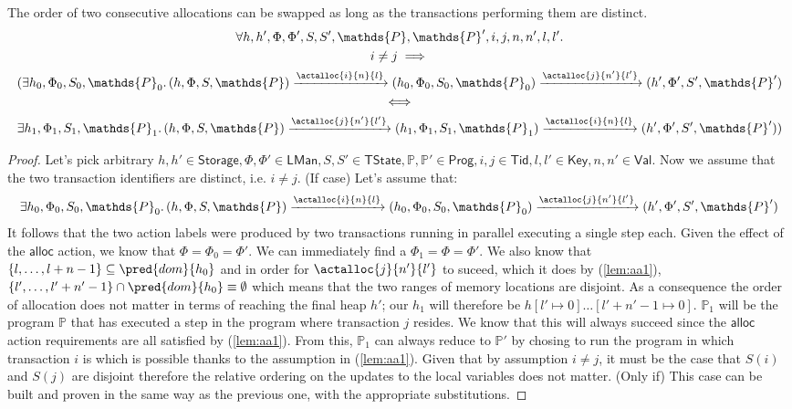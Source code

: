 \lem The order of two consecutive allocations can be swapped as long as the transactions performing them are distinct.
\begin{gather*}
	\forall h, h', \Phi, \Phi', S, S', \mathds{P}, \mathds{P}', i, j, n, n', l, l' \ldotp \\
	i \neq j \implies \\
	(\exists h_0, \Phi_0, S_0, \mathds{P}_0 \ldotp 
	(h, \Phi, S, \mathds{P}) \xrightarrow{\actalloc{i}{n}{l}} (h_0, \Phi_0, S_0, \mathds{P}_0)  \xrightarrow{\actalloc{j}{n'}{l'}} (h', \Phi', S', \mathds{P}') \\
	\iff \\
	\exists h_1, \Phi_1, S_1, \mathds{P}_1 \ldotp
	(h, \Phi, S, \mathds{P}) \xrightarrow{\actalloc{j}{n'}{l'}} (h_1, \Phi_1, S_1, \mathds{P}_1) \xrightarrow{\actalloc{i}{n}{l}} (h', \Phi', S', \mathds{P}'))
\end{gather*}
\begin{proof}
Let's pick arbitrary $h, h' \in \mathsf{Storage}, \Phi, \Phi' \in \mathsf{LMan}, S, S' \in \mathsf{TState}, \mathds{P}, \mathds{P}' \in \mathsf{Prog}, i, j \in \mathsf{Tid}, l, l' \in \mathsf{Key}, n, n' \in \mathsf{Val}$. Now we assume that the two transaction identifiers are distinct, i.e. $i \neq j$. (If case) Let's assume that:
\begin{gather} \label{lem:aa1}
	\exists h_0, \Phi_0, S_0, \mathds{P}_0 \ldotp 
	(h, \Phi, S, \mathds{P}) \xrightarrow{\actalloc{i}{n}{l}} (h_0, \Phi_0, S_0, \mathds{P}_0)  \xrightarrow{\actalloc{j}{n'}{l'}} (h', \Phi', S', \mathds{P}')
\end{gather}
It follows that the two action labels were produced by two transactions running in parallel executing a single step each. Given the effect of the $\mathsf{alloc}$ action, we know that $\Phi = \Phi_0 = \Phi'$. We can immediately find a $\Phi_1 = \Phi = \Phi'$. We also know that $\{l, \ldots, l + n - 1\} \subseteq \pred{dom}{h_0}$ and in order for $\actalloc{j}{n'}{l'}$ to suceed, which it does by (\ref{lem:aa1}), $\{l', \ldots, l' + n' - 1\} \cap \pred{dom}{h_0} \equiv \emptyset$ which means that the two ranges of memory locations are disjoint. As a consequence the order of allocation does not matter in terms of reaching the final heap $h'$; our $h_1$ will therefore be $h[l' \mapsto 0]\ldots[l' + n' - 1 \mapsto 0]$. $\mathds{P}_1$ will be the program $\mathds{P}$ that has executed a step in the program where transaction $j$ resides. We know that this will always succeed since the $\mathsf{alloc}$ action requirements are all satisfied by (\ref{lem:aa1}). From this, $\mathds{P}_1$ can always reduce to $\mathds{P}'$ by chosing to run the program in which transaction $i$ is which is possible thanks to the assumption in (\ref{lem:aa1}). Given that by assumption $i \neq j$, it must be the case that $S(i)$ and $S(j)$ are disjoint therefore the relative ordering on the updates to the local variables does not matter. (Only if) This case can be built and proven in the same way as the previous one, with the appropriate substitutions.
\end{proof}

